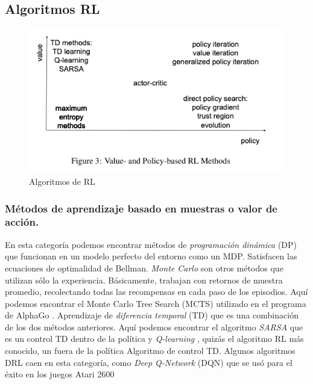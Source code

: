 \documentclass{svproc}
\begin{document}
\subsection{Algoritmos RL}\label{ss:rl_algorithms}

\begin{figure}[ht]
    \centering
    \includegraphics[width=1\textwidth]{figures/algorithms-RL.png}
    \caption{Algoritmos de RL}
    \label{fig:algorithmsRL}
\end{figure}


\subsubsection{Métodos de aprendizaje basado en muestras o valor de acción.}\label{ss:samplebased}
En esta categoría podemos encontrar métodos de \emph{programación dinámica} (DP) que funcionan en un modelo perfecto del entorno como un MDP. Satisfacen las ecuaciones de optimalidad de Bellman. \emph{Monte Carlo} son otros métodos que utilizan sólo la experiencia. Básicamente, trabajan con retornos de muestra promedio, recolectando todas las recompensas en cada paso de los episodios. Aquí podemos encontrar el Monte Carlo Tree Search (MCTS) utilizado en el programa de AlphaGo \cite{silver2016mastering}. Aprendizaje de \emph{diferencia temporal} (TD) que es una combinación de los dos métodos anteriores. Aquí podemos encontrar el algoritmo \emph{SARSA} \cite{rummery1994line} que es un control TD dentro de la política y \emph{Q-learning} \cite{watkins1989learning}, quizás el algoritmo RL más conocido, un fuera de la política Algoritmo de control TD. Algunos algoritmos DRL caen en esta categoría, como \emph{Deep Q-Network} (DQN) que se usó para el éxito en los juegos Atari 2600\cite{mnih2015human}
\end{document}
